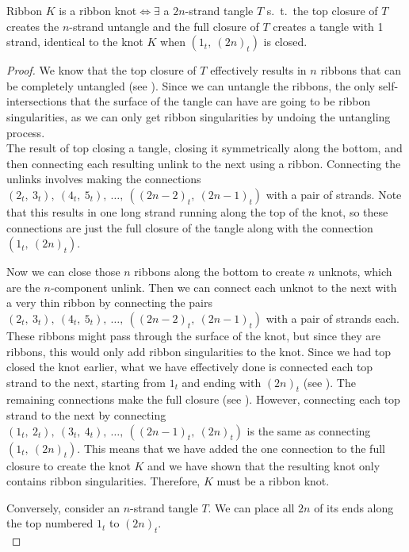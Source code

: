 \begin{paper}
\begin{paperthm}{Ribbon}
$K$ is a ribbon knot$\iff\exists$ a $2n$-strand tangle $T$ s.~t.~the top closure
of $T$ creates the $n$-strand untangle and the full closure of $T$ creates a
tangle with 1 strand, identical to the knot $K$ when $(1_t,~(2n)_t)$ is closed.
\end{paperthm}
\begin{proof}
We know that the top closure of $T$ effectively results in $n$ ribbons that can
be completely untangled (see \figTop).
Since we can untangle the ribbons, the only self-intersections that the surface
of the tangle can have are going to be ribbon singularities, as we can only get
ribbon singularities by undoing the untangling process.\\

{The result of top closing a tangle, closing it symmetrically
along the bottom, and then connecting each resulting unlink to the next using a
ribbon.
Connecting the unlinks involves making the connections
$(2_t,~3_t),~(4_t,~5_t),~\dots,~((2n-2)_t,~(2n-1)_t)$ with a pair of strands.
Note that this results in one long strand running along the top of the knot, so
these connections are just the full closure of the tangle along with the
connection $(1_t,~(2n)_t)$.}

Now we can close those $n$ ribbons along the bottom to create $n$ unknots, which
are the $n$-component unlink.
Then we can connect each unknot to the next with a very thin ribbon by
connecting the pairs $(2_t,~3_t),~(4_t,~5_t),~\dots,~((2n-2)_t,~(2n-1)_t)$ with
a pair of strands each.
These ribbons might pass through the surface of the knot, but since they are
ribbons, this would only add ribbon singularities to the knot.
Since we had top closed the knot earlier, what we have effectively done is
connected each top strand to the next, starting from $1_t$ and ending with
$(2n)_t$ (see \figProof).
The remaining connections make the full closure (see \figFull).
However, connecting each top strand to the next by connecting
$(1_t,~2_t),~(3_t,~4_t),~\dots,~((2n-1)_t,~(2n)_t)$ is the same as connecting
$(1_t,~(2n)_t)$.
This means that we have added the one connection to the full closure to create
the knot $K$ and we have shown that the resulting knot only contains ribbon
singularities.
Therefore, $K$ must be a ribbon knot.

Conversely, consider an $n$-strand tangle $T$.
We can place all $2n$ of its ends along the top numbered $1_t$ to $(2n)_t$.\\


\end{proof}
\end{paper}
